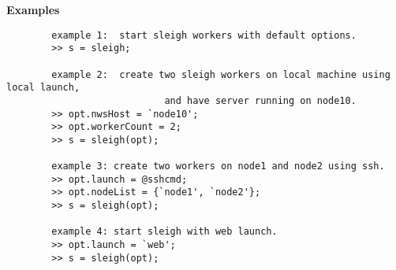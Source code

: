 \begin{list}{}{}
	\item {\bf Examples}
		\begin{verbatim}
		example 1:  start sleigh workers with default options.
		>> s = sleigh;		

		example 2:  create two sleigh workers on local machine using local launch, 
                            and have server running on node10.
		>> opt.nwsHost = `node10';
		>> opt.workerCount = 2;
		>> s = sleigh(opt);
     
		example 3: create two workers on node1 and node2 using ssh.
		>> opt.launch = @sshcmd;
		>> opt.nodeList = {`node1', `node2'};
		>> s = sleigh(opt);

		example 4: start sleigh with web launch.
		>> opt.launch = `web';
		>> s = sleigh(opt);
		\end{verbatim}
\end{list}

